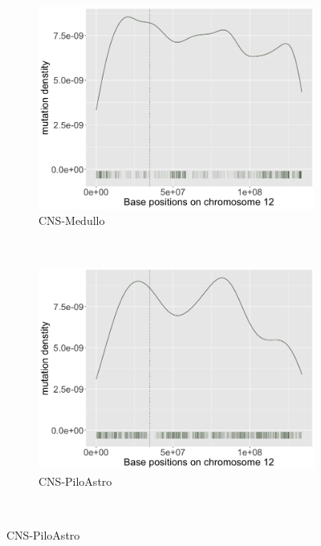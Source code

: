 \begin{figure}[ht!]
    \begin{subfigure}{.5\textwidth}
    \includegraphics[width=\linewidth,height=0.6\textwidth]{graphics/mutdistribution_CNS-Medullo.png}
    \caption{CNS-Medullo}
    \end{subfigure}
    ~
    \begin{subfigure}{.5\textwidth}
    \includegraphics[width=\linewidth,height=0.6\textwidth]{graphics/mutdistribution_CNS-PiloAstro.png}
    \caption{CNS-PiloAstro}
    \end{subfigure} \\
    \vspace{0.2cm}
    

\end{figure}
